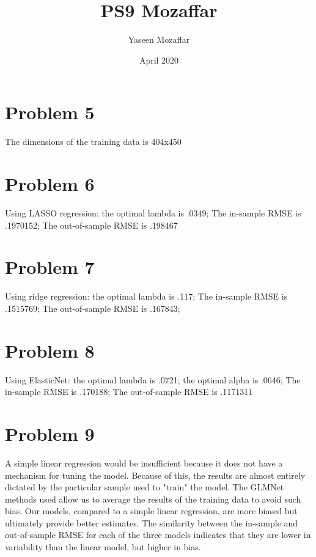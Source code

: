\documentclass{article} \usepackage[utf8]{inputenc} \title{PS9 Mozaffar}
\author{Yaseen Mozaffar } \date{April 2020} \usepackage{natbib}
\begin{document}
 \maketitle \section{Problem 5} 
The dimensions of the training data is 404x450 \section{Problem 6} Using 
LASSO regression: the optimal lambda is .0349; The in-sample RMSE is 
.1970152; The out-of-sample RMSE is .198467 \section{Problem 7} Using 
ridge regression: the optimal lambda is .117; The in-sample RMSE is 
.1515769; The out-of-sample RMSE is .167843; \section{Problem 8} Using 
ElasticNet: the optimal lambda is .0721; the optimal alpha is .0646; The 
in-sample RMSE is .170188; The out-of-sample RMSE is .1171311 
\section{Problem 9} A simple linear regression would be insufficient 
because it does not have a mechanism for tuning the model. Because of 
this, the results are almost entirely dictated by the particular sample 
used to "train" the model. The GLMNet methods used allow us to average 
the results of the training data to avoid such bias. Our models, 
compared to a simple linear regression, are more biased but ultimately 
provide better estimates. The similarity between the in-sample and 
out-of-sample RMSE for each of the three models indicates that they are 
lower in variability than the linear model, but higher in bias.
\end{document}
